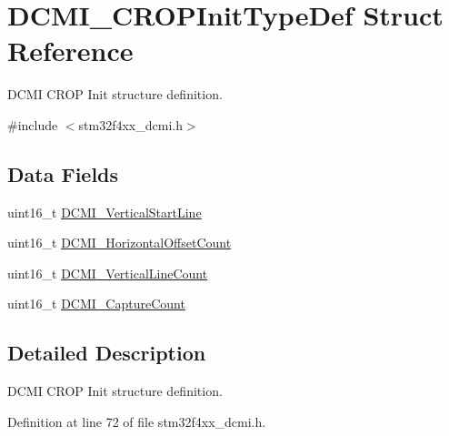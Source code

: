 \hypertarget{struct_d_c_m_i___c_r_o_p_init_type_def}{\section{D\-C\-M\-I\-\_\-\-C\-R\-O\-P\-Init\-Type\-Def Struct Reference}
\label{struct_d_c_m_i___c_r_o_p_init_type_def}
}


D\-C\-M\-I C\-R\-O\-P Init structure definition.  




{\ttfamily \#include $<$stm32f4xx\-\_\-dcmi.\-h$>$}

\subsection*{Data Fields}
\begin{DoxyCompactItemize}
\item 
uint16\-\_\-t \hyperlink{struct_d_c_m_i___c_r_o_p_init_type_def_af535547df102beb7e1435eb24cd2e262}{D\-C\-M\-I\-\_\-\-Vertical\-Start\-Line}
\item 
uint16\-\_\-t \hyperlink{struct_d_c_m_i___c_r_o_p_init_type_def_ae0b5043fbbed94113c749e24c150b542}{D\-C\-M\-I\-\_\-\-Horizontal\-Offset\-Count}
\item 
uint16\-\_\-t \hyperlink{struct_d_c_m_i___c_r_o_p_init_type_def_a43586118e74eb0f625d56dad90fd381e}{D\-C\-M\-I\-\_\-\-Vertical\-Line\-Count}
\item 
uint16\-\_\-t \hyperlink{struct_d_c_m_i___c_r_o_p_init_type_def_a7fe2fa515bf8d3fa989fedf6e4bd39e0}{D\-C\-M\-I\-\_\-\-Capture\-Count}
\end{DoxyCompactItemize}


\subsection{Detailed Description}
D\-C\-M\-I C\-R\-O\-P Init structure definition. 

Definition at line 72 of file stm32f4xx\-\_\-dcmi.\-h.




